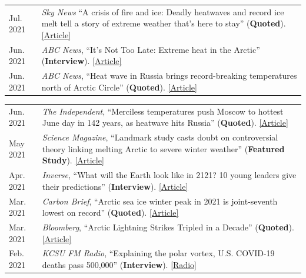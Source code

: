 \documentclass[margin,line,palatino,courier,10pt]{res}
\begin{document}
\begin{resume}
\begin{tabular}{@{}p{0.9in}p{4in}}
Jul. 2021 & \textit{Sky News} ``A crisis of fire and ice: Deadly heatwaves and record ice melt tell a story of extreme weather that’s here to stay'' (\textbf{Quoted}). \href{https://news.sky.com/story/climate-change-as-fire-rages-across-the-us-and-canada-ice-retreats-off-the-coast-of-siberia-12359277}{[Article]}\\
Jun. 2021 & \textit{ABC News}, ``It’s Not Too Late: Extreme heat in the Arctic'' (\textbf{Interview}). \href{https://abcnews.go.com/International/video/late-extreme-heat-arctic-78501037}{[Article]}\\
Jun. 2021 & \textit{ABC News}, ``Heat wave in Russia brings record-breaking temperatures north of Arctic Circle'' (\textbf{Quoted}). \href{https://abcnews.go.com/International/heat-wave-russia-brings-record-breaking-temperatures-north/story?id=78446355}{[Article]}\\
\end{tabular}
\begin{tabular}{@{}p{0.9in}p{4in}}
Jun. 2021 & \textit{The Independent}, ``Merciless temperatures push Moscow to hottest June day in 142 years, as heatwave hits Russia'' (\textbf{Quoted}). \href{https://www.independent.co.uk/climate-change/news/moscow-record-temperature-arctic-heatwave-b1871351.html}{[Article]}\\
May 2021 & \textit{Science Magazine}, ``Landmark study casts doubt on controversial theory linking melting Arctic to severe winter weather'' (\textbf{Featured Study}). \href{https://www.sciencemag.org/news/2021/05/landmark-study-casts-doubt-controversial-theory-linking-melting-arctic-severe-winter}{[Article]}\\
Apr. 2021 & \textit{Inverse}, ``What will the Earth look like in 2121? 10 young leaders give their predictions'' (\textbf{Interview}). \href{https://www.inverse.com/science/the-future-of-earth-needs-them}{[Article]}\\
Mar. 2021 & \textit{Carbon Brief}, ``Arctic sea ice winter peak in 2021 is joint-seventh lowest on record'' (\textbf{Quoted}). \href{https://www.carbonbrief.org/arctic-sea-ice-winter-peak-in-2021-is-joint-seventh-lowest-on-record}{[Article]}\\
Mar. 2021 & \textit{Bloomberg}, ``Arctic Lightning Strikes Tripled in a Decade'' (\textbf{Quoted}). \href{https://www.bloomberg.com/news/articles/2021-03-23/arctic-lightning-tripled-in-a-decade-climate-change-may-be-to-blame}{[Article]}\\
Feb. 2021 & \textit{KCSU FM Radio}, ``Explaining the polar vortex, U.S. COVID-19 deaths pass 500,000'' (\textbf{Interview}). \href{http://kcsufm.com/2021/02/explaining-the-polar-vortex-u-s-covid-19-deaths-pass-500000/}{[Radio]}\\

\end{tabular}
\end{resume}
\end{document}
